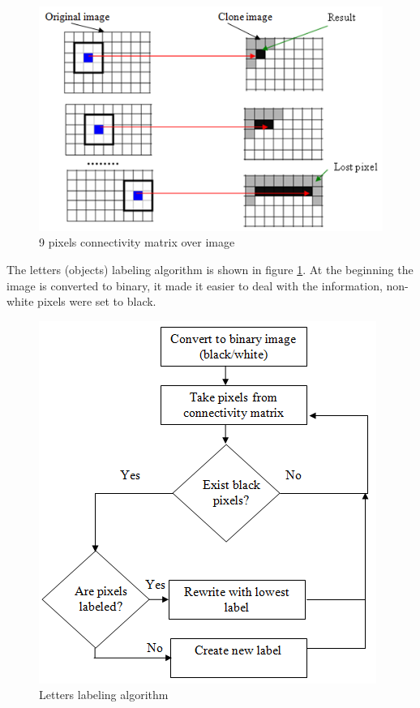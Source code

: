 \begin{figure}[H]
  \centering
  \includegraphics[scale= 0.6]{source/matriximages.png}
  \caption{9 pixels connectivity matrix over image}
  \label{fig:matriximages}
\end{figure}

The letters (objects) labeling algorithm is shown in figure \ref{fig:matriximages}. At the beginning the image is converted to binary, it made it easier to deal with the information, non-white pixels were set to black. 

\begin{figure}[H]
  \centering
  \includegraphics[scale= 0.6]{source/labeling.png}
  \caption{Letters labeling algorithm}
  \label{fig:labeling}
\end{figure}

